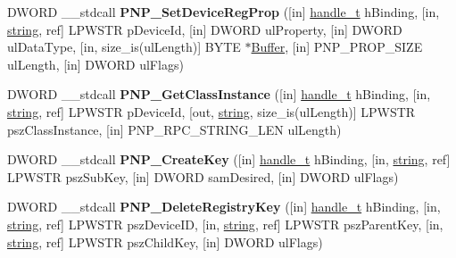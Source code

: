 \begin{DoxyCompactItemize}
\item 
\mbox{\label{interfacepnp_a9715949d2bdecabb3dd879bf21154bef}} 
D\+W\+O\+RD \+\_\+\+\_\+stdcall {\bfseries P\+N\+P\+\_\+\+Set\+Device\+Reg\+Prop} (\mbox{[}in\mbox{]} \hyperlink{interfacevoid}{handle\+\_\+t} h\+Binding, \mbox{[}in, \hyperlink{structstring}{string}, ref\mbox{]} L\+P\+W\+S\+TR p\+Device\+Id, \mbox{[}in\mbox{]} D\+W\+O\+RD ul\+Property, \mbox{[}in\mbox{]} D\+W\+O\+RD ul\+Data\+Type, \mbox{[}in, size\+\_\+is(ul\+Length)\mbox{]} B\+Y\+TE $\ast$\hyperlink{class_buffer}{Buffer}, \mbox{[}in\mbox{]} P\+N\+P\+\_\+\+P\+R\+O\+P\+\_\+\+S\+I\+ZE ul\+Length, \mbox{[}in\mbox{]} D\+W\+O\+RD ul\+Flags)
\item 
\mbox{\label{interfacepnp_a59d4643b33826111f467fa3489be9a3d}} 
D\+W\+O\+RD \+\_\+\+\_\+stdcall {\bfseries P\+N\+P\+\_\+\+Get\+Class\+Instance} (\mbox{[}in\mbox{]} \hyperlink{interfacevoid}{handle\+\_\+t} h\+Binding, \mbox{[}in, \hyperlink{structstring}{string}, ref\mbox{]} L\+P\+W\+S\+TR p\+Device\+Id, \mbox{[}out, \hyperlink{structstring}{string}, size\+\_\+is(ul\+Length)\mbox{]} L\+P\+W\+S\+TR psz\+Class\+Instance, \mbox{[}in\mbox{]} P\+N\+P\+\_\+\+R\+P\+C\+\_\+\+S\+T\+R\+I\+N\+G\+\_\+\+L\+EN ul\+Length)
\item 
\mbox{\label{interfacepnp_a0244327c6902a7b7f2f0c8ebf1173d7f}} 
D\+W\+O\+RD \+\_\+\+\_\+stdcall {\bfseries P\+N\+P\+\_\+\+Create\+Key} (\mbox{[}in\mbox{]} \hyperlink{interfacevoid}{handle\+\_\+t} h\+Binding, \mbox{[}in, \hyperlink{structstring}{string}, ref\mbox{]} L\+P\+W\+S\+TR psz\+Sub\+Key, \mbox{[}in\mbox{]} D\+W\+O\+RD sam\+Desired, \mbox{[}in\mbox{]} D\+W\+O\+RD ul\+Flags)
\item 
\mbox{\label{interfacepnp_aed419927824ba8014e0b70fc91a807a7}} 
D\+W\+O\+RD \+\_\+\+\_\+stdcall {\bfseries P\+N\+P\+\_\+\+Delete\+Registry\+Key} (\mbox{[}in\mbox{]} \hyperlink{interfacevoid}{handle\+\_\+t} h\+Binding, \mbox{[}in, \hyperlink{structstring}{string}, ref\mbox{]} L\+P\+W\+S\+TR psz\+Device\+ID, \mbox{[}in, \hyperlink{structstring}{string}, ref\mbox{]} L\+P\+W\+S\+TR psz\+Parent\+Key, \mbox{[}in, \hyperlink{structstring}{string}, ref\mbox{]} L\+P\+W\+S\+TR psz\+Child\+Key, \mbox{[}in\mbox{]} D\+W\+O\+RD ul\+Flags)
\item 
\mbox{\label{interfacepnp_adc4ee088ccab05c5f6749f4acb125bc7}} 

\end{DoxyCompactItemize}
